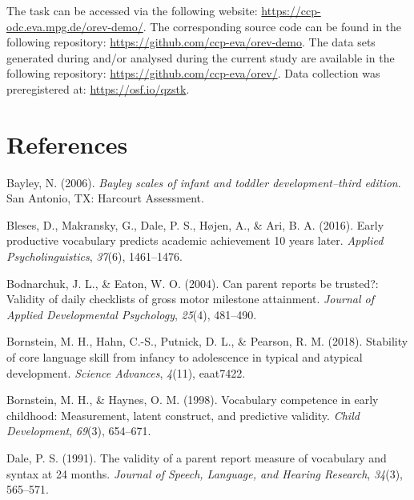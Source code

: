 \documentclass[
  man,floatsintext]{apa6}
\newlength{\cslhangindent}
\newlength{\cslentryspacingunit} %
\newenvironment{CSLReferences}[2] %
 {%
  \setlength{\parindent}{0pt}
  \ifodd #1
  \let\oldpar\par
  \def\par{\hangindent=\cslhangindent\oldpar}
  \fi
  \setlength{\parskip}{#2\cslentryspacingunit}
 }%
 {}
\begin{document}
The task can be accessed via the following website: \url{https://ccp-odc.eva.mpg.de/orev-demo/}. The corresponding source code can be found in the following repository: \url{https://github.com/ccp-eva/orev-demo}. The data sets generated during and/or analysed during the current study are available in the following repository: \url{https://github.com/ccp-eva/orev/}. Data collection was preregistered at: \url{https://osf.io/qzstk}.

\newpage

\hypertarget{references}{%
\section{References}\label{references}}

\hypertarget{refs}{}
\begin{CSLReferences}{1}{0}
\leavevmode{}%
Bayley, N. (2006). \emph{Bayley scales of infant and toddler development--third edition}. San Antonio, TX: Harcourt Assessment.

\leavevmode{}%
Bleses, D., Makransky, G., Dale, P. S., Højen, A., \& Ari, B. A. (2016). Early productive vocabulary predicts academic achievement 10 years later. \emph{Applied Psycholinguistics}, \emph{37}(6), 1461--1476.

\leavevmode{}%
Bodnarchuk, J. L., \& Eaton, W. O. (2004). Can parent reports be trusted?: Validity of daily checklists of gross motor milestone attainment. \emph{Journal of Applied Developmental Psychology}, \emph{25}(4), 481--490.

\leavevmode{}%
Bornstein, M. H., Hahn, C.-S., Putnick, D. L., \& Pearson, R. M. (2018). Stability of core language skill from infancy to adolescence in typical and atypical development. \emph{Science Advances}, \emph{4}(11), eaat7422.

\leavevmode{}%
Bornstein, M. H., \& Haynes, O. M. (1998). Vocabulary competence in early childhood: Measurement, latent construct, and predictive validity. \emph{Child Development}, \emph{69}(3), 654--671.

\leavevmode{}%
Dale, P. S. (1991). The validity of a parent report measure of vocabulary and syntax at 24 months. \emph{Journal of Speech, Language, and Hearing Research}, \emph{34}(3), 565--571.


\end{CSLReferences}
\end{document}
